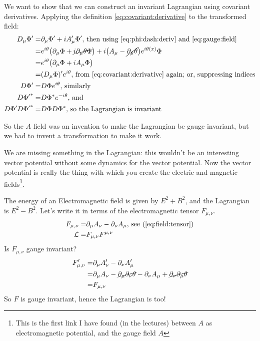 \documentclass[]{article}
\begin{document}
We want to show that we can construct an invariant Lagrangian using covariant derivatives. Applying the definition \eqref{eq:covariant:derivative} to the transformed field:
\begin{align*}
	D_\mu \Phi^\prime =& \partial_\mu \Phi^\prime + i A_\mu^\prime \Phi^\prime\text{, then using \eqref{eq:phi:dash:deriv} and  \eqref{eq:gauge:field}}\\
	=& e^{i\theta}\big(\partial_\mu \Phi +\cancel{i\partial_\mu \theta \Phi} \big) + i \big(A_\mu -\cancel{ \partial_\mu \theta} \big) e^{i \theta(x)} \Phi\\
	=& e^{i\theta} \big( \partial_\mu \Phi +i A_\mu \Phi \big)\\
	=& (D_\mu \Phi)^\prime e^{i\theta} \text{, from \eqref{eq:covariant:derivative} again; or, suppressing indices}\\
	D \Phi^\prime =&  D \Phi  e^{i \theta} \text{, similarly}\\
	D {\Phi^\prime}^* =& D {\Phi}^*  e^{-i \theta} \text{, and}\\
	D \Phi^\prime D {\Phi^\prime}^*=& D \Phi D {\Phi}^* \text{, so the Lagrangian is invariant}
\end{align*}

So the $A$ field was an invention to make the Lagrangian be gauge invariant, but we had to invent a transformation to make it work.

We are missing something in the Lagrangian: this wouldn't be an interesting vector potential without some dynamics for the vector potential. Now the vector potential is really the thing with which you create the electric and magnetic fields\footnote{This is the first link I have found (in the lectures) between $A$ as electromagnetic potential, and the gauge field $A$}.

The energy of an Electromagnetic field is given by $E^2 + B^2$, and the Lagrangian is $E^2-B^2$. Let's write it in terms of the electromagnetic tensor $F_{\mu,\nu}$.
\begin{align*} 
	F_{\mu,\nu} =& \partial_\mu A_\nu - \partial_\nu A_\mu \text{, see (\ref{eq:field:tensor})}\\
	\mathcal{L} =& F_{\mu,\nu} F^{\mu,\nu} 
\end{align*}
Is $F_{\mu,\nu}$ gauge invariant?
\begin{align*}
	F_{\mu,\nu}^\prime =&\partial_\mu A_\nu^\prime - \partial_\nu A_\mu^\prime\\
	=& \partial_\mu A_\nu - \cancel{\partial_\mu \partial_\nu \theta}-\partial_\nu A_\mu + \cancel{\partial_\nu \partial_\mu \theta}\\
	=& 	F_{\mu,\nu}
\end{align*}
So $F$ is gauge invariant, hence the Lagrangian is too!
\end{document}
